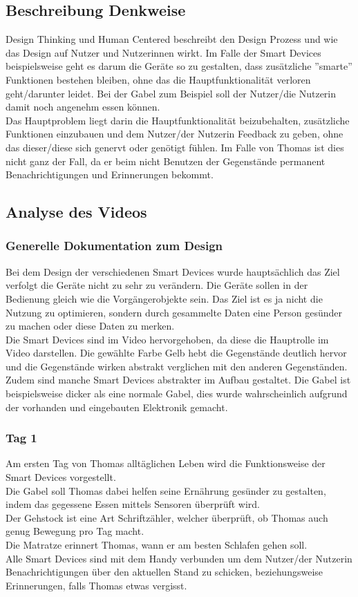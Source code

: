 
\subsection{Beschreibung Denkweise}
Design Thinking und Human Centered beschreibt den Design Prozess und wie das Design auf Nutzer und Nutzerinnen wirkt. Im Falle der Smart Devices beispielsweise geht es darum die Geräte so zu gestalten, dass zusätzliche ''smarte'' Funktionen bestehen bleiben, ohne das die Hauptfunktionalität verloren geht/darunter leidet. Bei der Gabel zum Beispiel soll der Nutzer/die Nutzerin damit noch angenehm essen können. \\
Das Hauptproblem liegt darin die Hauptfunktionalität beizubehalten, zusätzliche Funktionen einzubauen und dem Nutzer/der Nutzerin Feedback zu geben, ohne das dieser/diese sich genervt oder genötigt fühlen. Im Falle von Thomas ist dies nicht ganz der Fall, da er beim nicht Benutzen der Gegenstände permanent Benachrichtigungen und Erinnerungen bekommt.
\subsection{Analyse des Videos}
\subsubsection{\textbf{Generelle Dokumentation zum Design}} 
Bei dem Design der verschiedenen Smart Devices wurde hauptsächlich das Ziel verfolgt die Geräte nicht zu sehr zu verändern. Die Geräte sollen in der Bedienung gleich wie die Vorgängerobjekte sein. Das Ziel ist es ja nicht die Nutzung zu optimieren, sondern durch gesammelte Daten eine Person gesünder zu machen oder diese Daten zu merken. \\
Die Smart Devices sind im Video hervorgehoben, da diese die Hauptrolle im Video darstellen. Die gewählte Farbe Gelb hebt die Gegenstände deutlich hervor und die Gegenstände wirken abstrakt verglichen mit den anderen Gegenständen. Zudem sind manche Smart Devices abstrakter im Aufbau gestaltet. Die Gabel ist beispielsweise dicker als eine normale Gabel, dies wurde wahrscheinlich aufgrund der vorhanden und eingebauten Elektronik gemacht. \\
\subsubsection{\textbf{Tag 1}} 
Am ersten Tag von Thomas alltäglichen Leben wird die Funktionsweise der Smart Devices vorgestellt. \\
Die Gabel soll Thomas dabei helfen seine Ernährung gesünder zu gestalten, indem das gegessene Essen mittels Sensoren überprüft wird. \\
Der Gehstock ist eine Art Schriftzähler, welcher überprüft, ob Thomas auch genug Bewegung pro Tag macht. \\
Die Matratze erinnert Thomas, wann er am besten Schlafen gehen soll. \\
Alle Smart Devices sind mit dem Handy verbunden um dem Nutzer/der Nutzerin Benachrichtigungen über den aktuellen Stand zu schicken, beziehungsweise Erinnerungen, falls Thomas etwas vergisst.
